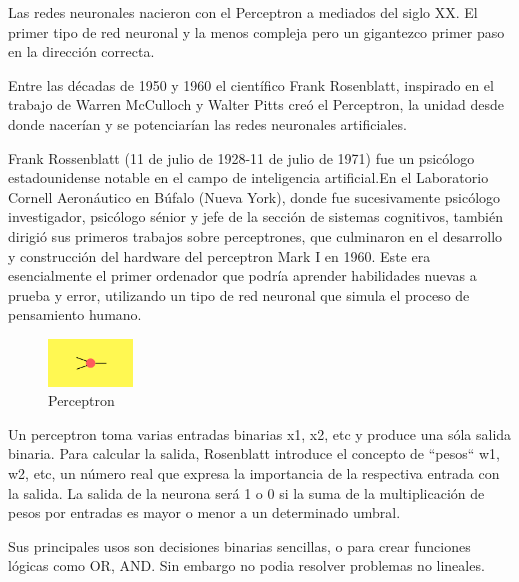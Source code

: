 \documentclass[a4paper]{article}
\begin{document}
Las redes neuronales nacieron con el Perceptron a mediados del 
siglo XX. El primer tipo de red neuronal y la menos compleja pero 
un gigantezco primer paso en la dirección correcta.

Entre las décadas de 1950 y 1960 el científico Frank Rosenblatt, 
inspirado en el trabajo de Warren McCulloch y Walter Pitts creó el 
Perceptron, la unidad desde donde nacerían y se potenciarían las 
redes neuronales artificiales.


Frank Rossenblatt (11 de julio de 1928-11 de julio de 1971) fue un
psicólogo estadounidense notable en el campo de inteligencia
artificial.En el Laboratorio Cornell Aeronáutico en Búfalo (Nueva
York), donde fue sucesivamente psicólogo investigador, psicólogo
sénior y jefe de la sección de sistemas cognitivos,
también dirigió sus primeros trabajos 
sobre perceptrones, que culminaron en el desarrollo
 y construcción del hardware del 
 perceptron Mark I en
1960.
Este era esencialmente el primer ordenador que podría aprender 
habilidades nuevas a prueba y error, utilizando un tipo de red 
neuronal que simula el proceso de pensamiento humano. 

\begin{figure} %
    \centering
    \includegraphics[width=0.2\textwidth]{./images/net_perceptron.png}
    \caption{Perceptron}
\end{figure}
Un perceptron toma varias entradas binarias x1, x2, etc y produce 
una sóla salida binaria. Para calcular la salida, Rosenblatt 
introduce el concepto de ``pesos`` w1, w2, etc, un número real que 
expresa la importancia de la respectiva entrada con la salida. La 
salida de la neurona será 1 o 0 si la suma de la multiplicación de 
pesos por entradas es mayor o menor a un determinado umbral.

Sus principales usos son decisiones binarias sencillas, o para 
crear funciones lógicas como OR, AND. Sin embargo no podia 
resolver problemas no lineales.

\qquad
\end{document}
